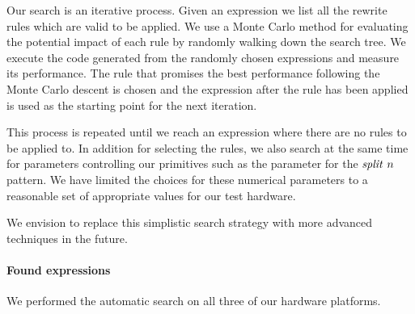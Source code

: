 Our search is an iterative process.
Given an expression we list all the rewrite rules which are valid to be applied.
We use a Monte Carlo method for evaluating the potential impact of each rule by randomly walking down the search tree.
We execute the code generated from the randomly chosen expressions and measure its performance.
The rule that promises the best performance following the Monte Carlo descent is chosen and the expression after the rule has been applied is used as the starting point for the next iteration.

This process is repeated until we reach an expression where there are no rules to be applied to.
In addition for selecting the rules, we also search at the same time for parameters controlling our primitives such as the parameter for the $\text{\textit{split}}\ n$ pattern.
We have limited the choices for these numerical parameters to a reasonable set of appropriate values for our test hardware.

We envision to replace this simplistic search strategy with more advanced techniques in the future.

\paragraph{Found expressions}
We performed the automatic search on all three of our hardware platforms.

